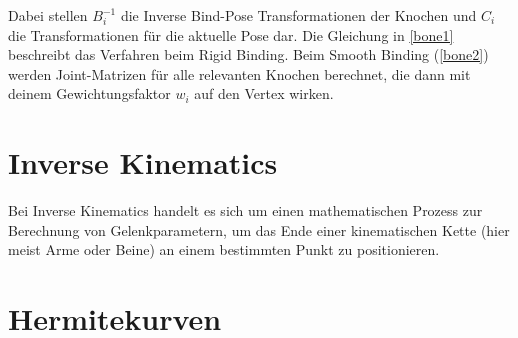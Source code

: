 Dabei stellen $B_{i}^{-1}$ die Inverse Bind-Pose Transformationen der Knochen und $C_{i}$ die Transformationen für die aktuelle Pose dar. Die Gleichung in \ref{bone1} beschreibt das Verfahren beim Rigid Binding. Beim Smooth Binding (\ref{bone2}) werden Joint-Matrizen für alle relevanten Knochen berechnet, die dann mit deinem Gewichtungsfaktor $w_{i}$ auf den Vertex wirken.

\section{Inverse Kinematics}
Bei Inverse Kinematics handelt es sich um einen mathematischen Prozess zur Berechnung von Gelenkparametern, um das Ende einer kinematischen Kette (hier meist Arme oder Beine) an einem bestimmten Punkt zu positionieren. 

\section{Hermitekurven}